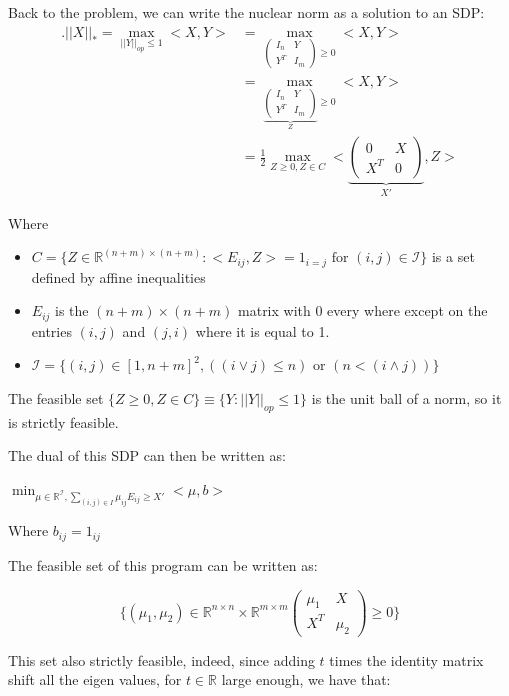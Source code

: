 \documentclass[11pt]{article}
\begin{document}
Back to the problem, we can write the nuclear norm as a solution to an SDP:
\begin{align*}
.||X||_* = \max_{||Y||_{op} \le 1} <X, Y>
&= \max_{\begin{pmatrix}I_n&Y\\Y^T&I_m\end{pmatrix} \ge 0} <X, Y>
\\&= \max_{\underbrace{\begin{pmatrix}I_n&Y\\Y^T&I_m\end{pmatrix}}_Z \ge 0} <X, Y>
\\&= \frac12 \max_{Z \ge 0, Z \in C}  < \underbrace{\begin{pmatrix}0&X\\X^T&0\end{pmatrix}}_{X'}, Z>
\end{align*}

Where
\begin{itemize}
\item \(C = \{Z \in \mathbb R^{(n+m)\times(n+m)} : <E_{ij},Z> = 1_{i = j} \text{ for } (i, j) \in \mathcal I \}\) is a set defined by affine inequalities
\item \(E_{ij}\) is the \((n+m)\times(n+m)\) matrix with 0 every where except on the entries \((i,j)\) and \((j, i)\) where it is equal to 1.
\item \(\mathcal I = \{ (i, j) \in [1, n+m]^2, ((i \vee j) \le n) \text{ or } (n < (i \wedge j))\}\)
\end{itemize}

The feasible set \(\{Z \ge 0, Z \in C\} \equiv \{Y : ||Y||_{op} \le 1\}\) is the unit ball of a norm, so it is strictly feasible.

The dual of this SDP can then be written as:

\(\min_{\mu \in \mathbb R^{\mathcal I}, \sum_{(i,j) \in I} \mu_{ij} E_{ij} \ge X'} <\mu, b>\)

Where \(b_{ij} = 1_{ij}\)

The feasible set of this program can be written as:

$$\{ (\mu_1, \mu_2) \in \mathbb R^{n\times n} \times \mathbb R^{m \times m} \begin{pmatrix}\mu_1&X\\X^T&\mu_2\end{pmatrix} \ge 0\}$$

This set also strictly feasible, indeed, since adding \(t\) times the identity matrix shift all the eigen values, for \(t \in \mathbb R\) large enough, we have that:
\end{document}
